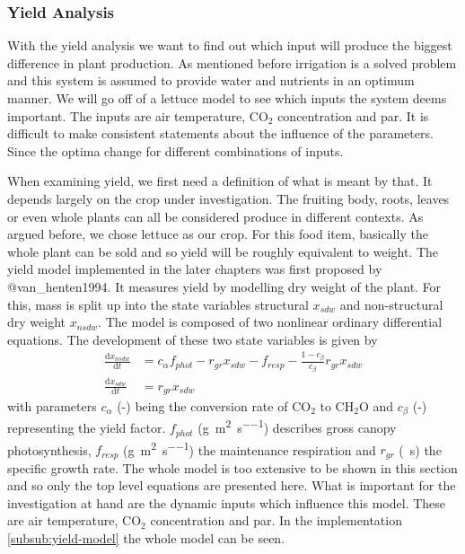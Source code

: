 \subsubsection{Yield Analysis}
\label{subsub:yield-analysis}
With the yield analysis we want to find out which input will produce the biggest difference in plant production.
As mentioned before irrigation is a solved problem and this system is assumed to provide water and nutrients in an optimum manner.
We will go off of a lettuce model to see which inputs the system deems important.
The inputs are air temperature, CO$_2$ concentration and \acl{par}.
It is difficult to make consistent statements about the influence of the parameters.
Since the optima change for different combinations of inputs.

When examining yield, we first need a definition of what is meant by that.
It depends largely on the crop under investigation.
The fruiting body, roots, leaves or even whole plants can all be considered produce in different contexts.
As argued before, we chose lettuce as our crop.
For this food item, basically the whole plant can be sold and so yield will be roughly equivalent to weight.
The yield model implemented in the later chapters was first proposed by @van\_henten1994.
It measures yield by modelling dry weight of the plant.
For this, mass is split up into the state variables structural $x_{sdw}$ and non-structural dry weight $x_{nsdw}$.
The model is composed of two nonlinear ordinary differential equations.
The development of these two state variables is given by
\begin{align*}
  \frac{\mathrm{d}x_{nsdw}}{\mathrm{d}t} &= c_\alpha f_{phot} - r_{gr} x_{sdw} - f_{resp} - \frac{1-c_\beta}{c_\beta} r_{gr} x_{sdw}\\
  \frac{\mathrm{d}x_{sdw}}{\mathrm{d}t} &= r_{gr} x_{sdw}
\end{align*}
with parameters $c_\alpha$ (-) being the conversion rate of CO$_2$ to CH$_2$O and $c_\beta$ (-) representing the yield factor.
$f_{phot}$ (\si{\g\per\square\m\per\s}) describes gross canopy photosynthesis, $f_{resp}$ (\si{\g\per\square\m\per\s}) the maintenance respiration and $r_{gr}$ (\si{\per\s}) the specific growth rate.
The whole model is too extensive to be shown in this section and so only the top level equations are presented here.
What is important for the investigation at hand are the dynamic inputs which influence this model.
These are air temperature, CO$_2$ concentration and \acl{par}.
In the implementation \ref{subsub:yield-model} the whole model can be seen.

